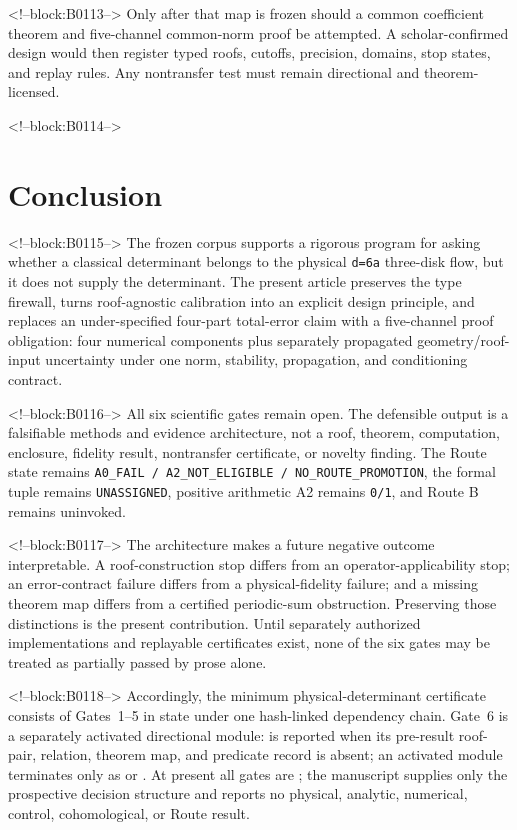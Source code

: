 \documentclass[11pt,a4paper]{article}
\begin{document}
<!--block:B0113-->
Only after that map is frozen should a common coefficient theorem and five-channel common-norm proof be attempted. A scholar-confirmed design would then register typed roofs, cutoffs, precision, domains, stop states, and replay rules. Any nontransfer test must remain directional and theorem-licensed.

<!--block:B0114-->
\section{Conclusion}

<!--block:B0115-->
The frozen corpus supports a rigorous program for asking whether a classical determinant belongs to the physical \texttt{d=6a} three-disk flow, but it does not supply the determinant. The present article preserves the type firewall, turns roof-agnostic calibration into an explicit design principle, and replaces an under-specified four-part total-error claim with a five-channel proof obligation: four numerical components plus separately propagated geometry/roof-input uncertainty under one norm, stability, propagation, and conditioning contract.

<!--block:B0116-->
All six scientific gates remain open. The defensible output is a falsifiable methods and evidence architecture, not a roof, theorem, computation, enclosure, fidelity result, nontransfer certificate, or novelty finding. The Route state remains \texttt{A0\_FAIL\ /\ A2\_NOT\_ELIGIBLE\ /\ NO\_ROUTE\_PROMOTION}, the formal tuple remains \texttt{UNASSIGNED}, positive arithmetic A2 remains \texttt{0/1}, and Route B remains uninvoked.

<!--block:B0117-->
The architecture makes a future negative outcome interpretable. A roof-construction stop differs from an operator-applicability stop; an error-contract failure differs from a physical-fidelity failure; and a missing theorem map differs from a certified periodic-sum obstruction. Preserving those distinctions is the present contribution. Until separately authorized implementations and replayable certificates exist, none of the six gates may be treated as partially passed by prose alone.

<!--block:B0118-->
Accordingly, the minimum physical-determinant certificate consists of Gates~1--5 in  state under one hash-linked dependency chain. Gate~6 is a separately activated directional module:  is reported when its pre-result roof-pair, relation, theorem map, and predicate record is absent; an activated module terminates only as  or . At present all gates are ; the manuscript supplies only the prospective decision structure and reports no physical, analytic, numerical, control, cohomological, or Route result.
\end{document}
